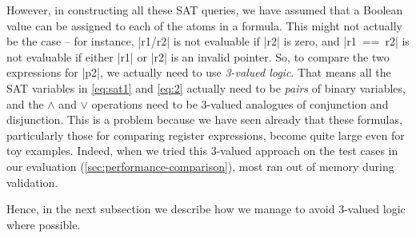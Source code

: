{%
However, in constructing all these SAT queries, we have assumed that a Boolean
value can be assigned to each of the atoms in a formula. This might not actually
be the case -- for instance, \rtlinline|r1/r2| is not evaluable if
\rtlinline|r2| is zero, and \rtlinline|r1 == r2| is not evaluable if either
\rtlinline|r1| or \rtlinline|r2| is an invalid pointer.  So, to compare the two
expressions for \rtlinline|p2|, we actually need to use \emph{3-valued logic}.
That means all the SAT variables in \eqref{eq:sat1} and \eqref{eq:2} actually
need to be \emph{pairs} of binary variables,
and the $\land$ and $\lor$ operations need to be 3-valued analogues of
conjunction and disjunction. This is a problem because we have seen already that
these formulas, particularly those for comparing register expressions, become
quite large even for toy examples.  Indeed, when we tried this 3-valued approach
on the test cases in our evaluation (\cref{sec:performance-comparison}), most
ran out of memory during validation.


Hence, in the next subsection we describe how we manage to avoid 3-valued logic
where possible.



}
